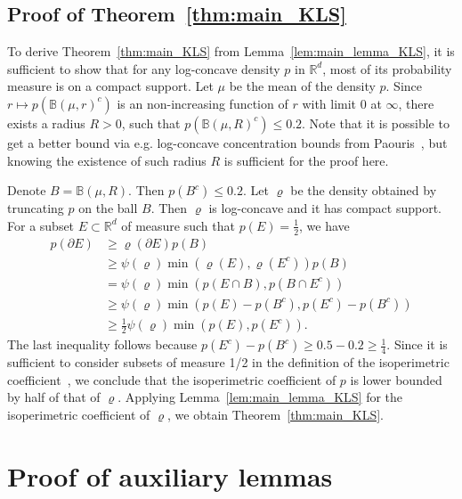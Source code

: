 \documentclass[11pt,twoside]{article}
\newcommand{\isoperi}{\psi}
\theoremstyle{named}
\theoremstyle{plain}
\newcommand{\usedim}{\ensuremath{d}}
\newcommand{\dims}{\usedim}
\newcommand{\real}{\ensuremath{\mathbb{R}}}
\newcommand{\parenth}[1]{\left( #1 \right)}
\begin{document}

\subsection{Proof of Theorem~\ref{thm:main_KLS}} %
\label{sub:proof_of_theorem_thm:main_kls}
To derive Theorem~\ref{thm:main_KLS} from Lemma~\ref{lem:main_lemma_KLS}, it is sufficient to show that for any log-concave density $p$ in $\real^\dims$, most of its probability measure is on a compact support. Let $\mu$ be the mean of the density $p$. Since $r \mapsto p(\mathbb{B}\parenth{\mu, r}^c)$ is an non-increasing function of $r$ with limit $0$ at $\infty$, there exists a radius $R > 0$, such that $p(\mathbb{B}\parenth{\mu, R}^c) \leq 0.2$. Note that it is possible to get a better bound via e.g. log-concave concentration bounds from Paouris~\cite{paouris2006concentration}, but knowing the existence of such radius $R$ is sufficient for the proof here.

Denote $B = \mathbb{B}\parenth{\mu, R}$. Then $p(B^c)\leq 0.2$. Let $\varrho$ be the density obtained by truncating $p$ on the ball $B$. Then $\varrho$ is log-concave and it has compact support.
For a subset $E \subset \real^\dims$ of measure such that $p(E) = \frac{1}{2}$, we have
\begin{align*}
  p(\partial E) &\geq \varrho(\partial E) p(B) \\
  &\geq \isoperi(\varrho) \min\parenth{\varrho(E), \varrho(E^c)} p(B) \\
  &= \isoperi(\varrho) \min\parenth{p(E \cap B), p(B \cap E^c)} \\
  &\geq \isoperi(\varrho) \min\parenth{p(E) - p(B^c), p(E^c) - p(B^c)} \\
  &\geq \frac{1}{2} \isoperi(\varrho) \min\parenth{p(E), p(E^c)}.
\end{align*}
The last inequality follows because $p(E^c) - p(B^c) \geq 0.5 - 0.2 \geq \frac{1}{4}$.
Since it is sufficient to consider subsets of measure 1/2 in the definition of the isoperimetric coefficient~\cite{sternberg1999connectivity,milman2009role}, we conclude that the isoperimetric coefficient of $p$ is lower bounded by half of that of $\varrho$. Applying Lemma~\ref{lem:main_lemma_KLS} for the isoperimetric coefficient of $\varrho$, we obtain Theorem~\ref{thm:main_KLS}.





\section{Proof of auxiliary lemmas} %
\label{sec:proof_of_auxiliary_lemmas}
\end{document}
